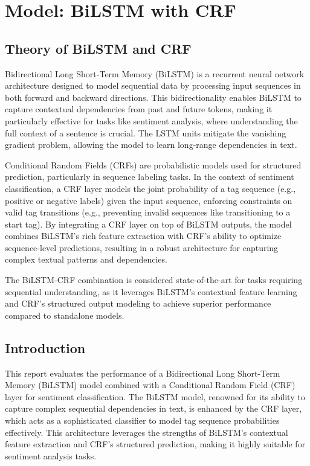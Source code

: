 \section{Model: BiLSTM with CRF}

\subsection{Theory of BiLSTM and CRF}

Bidirectional Long Short-Term Memory (BiLSTM) is a recurrent neural network architecture designed to model sequential data by processing input sequences in both forward and backward directions. This bidirectionality enables BiLSTM to capture contextual dependencies from past and future tokens, making it particularly effective for tasks like sentiment analysis, where understanding the full context of a sentence is crucial. The LSTM units mitigate the vanishing gradient problem, allowing the model to learn long-range dependencies in text.

Conditional Random Fields (CRFs) are probabilistic models used for structured prediction, particularly in sequence labeling tasks. In the context of sentiment classification, a CRF layer models the joint probability of a tag sequence (e.g., positive or negative labels) given the input sequence, enforcing constraints on valid tag transitions (e.g., preventing invalid sequences like transitioning to a start tag). By integrating a CRF layer on top of BiLSTM outputs, the model combines BiLSTM’s rich feature extraction with CRF’s ability to optimize sequence-level predictions, resulting in a robust architecture for capturing complex textual patterns and dependencies.

The BiLSTM-CRF combination is considered state-of-the-art for tasks requiring sequential understanding, as it leverages BiLSTM’s contextual feature learning and CRF’s structured output modeling to achieve superior performance compared to standalone models.

\subsection{Introduction}

This report evaluates the performance of a Bidirectional Long Short-Term Memory (BiLSTM) model combined with a Conditional Random Field (CRF) layer for sentiment classification. The BiLSTM model, renowned for its ability to capture complex sequential dependencies in text, is enhanced by the CRF layer, which acts as a sophisticated classifier to model tag sequence probabilities effectively. This architecture leverages the strengths of BiLSTM’s contextual feature extraction and CRF’s structured prediction, making it highly suitable for sentiment analysis tasks.

